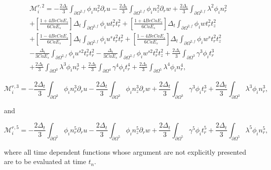 \documentclass{article}
\begin{document}
\begin{equation}
\begin{array}{l} \mathcal{M}_i^{r,2} = -\frac{2\Delta_t}{3} \int_{\partial \Omega^{2,f}} \phi_i n_r^2 \partial_r u - \frac{2\Delta_t}{3} \int_{\partial \Omega^{2,f}} \phi_i n_z^2 \partial_r w + \frac{2\Delta_t}{3} \int_{\partial \Omega^{2,f}} \lambda^2 \phi_i n_r^2 \\ + \left[ \frac{1 + 4Be Ca E_s}{6Ca E_s} \right] \Delta_t \int_{\partial \Omega^{2,f}} \phi_i u t_r^2 t_r^2 + \left[ \frac{1 + 4Be Ca E_s}{6Ca E_s} \right] \Delta_t \int_{\partial \Omega^{2,f}} \phi_i w t_r^2 t_z^2 \\ + \left[ \frac{1 - 4Be Ca E_s}{6Ca E_s} \right] \Delta_t \int_{\partial \Omega^{2,f}} \phi_i u^s t_r^2 t_r^2 + \left[ \frac{1 - 4Be Ca E_s}{6Ca E_s} \right] \Delta_t \int_{\partial \Omega^{2,f}} \phi_i w^s t_r^2 t_z^2 \\ - \frac{\Delta_t}{3Ca E_s} \int_{\partial \Omega^{2,f}} \phi_i u^{s2} t_r^2 t_r^2 - \frac{\Delta_t}{3Ca E_s} \int_{\partial \Omega^{2,f}} \phi_i w^{s2} t_r^2 t_z^2 + \frac{2\Delta_t}{3} \int_{\partial \Omega^{3}} \gamma^3 \phi_i t_r^3 \\ + \frac{2\Delta_t}{3} \int_{\partial \Omega^{3}} \lambda^3 \phi_i n_r^3 + \frac{2\Delta_t}{3} \int_{\partial \Omega^{4}} \gamma^4 \phi_i t_r^4 + \frac{2\Delta_t}{3} \int_{\partial \Omega^{5}} \lambda^4 \phi_i n_r^4, \end{array} \tag{4.63}
\end{equation}

\begin{equation}
\mathcal{M}_i^{r,3} = -\frac{2\Delta_t}{3} \int_{\partial \Omega^{3}} \phi_i n_r^3 \partial_r u - \frac{2\Delta_t}{3} \int_{\partial \Omega^{3}} \phi_i n_z^3 \partial_r w + \frac{2\Delta_t}{3} \int_{\partial \Omega^{3}} \gamma^3 \phi_i t_r^3 + \frac{2\Delta_t}{3} \int_{\partial \Omega^{3}} \lambda^3 \phi_i n_r^3, \tag{4.64}
\end{equation}

and

\begin{equation}
\mathcal{M}_i^{r,5} = -\frac{2\Delta_t}{3} \int_{\partial \Omega^{5}} \phi_i n_r^5 \partial_r u - \frac{2\Delta_t}{3} \int_{\partial \Omega^{5}} \phi_i n_z^5 \partial_r w + \frac{2\Delta_t}{3} \int_{\partial \Omega^{5}} \gamma^5 \phi_i t_r^5 + \frac{2\Delta_t}{3} \int_{\partial \Omega^{5}} \lambda^5 \phi_i n_r^5, \tag{4.65}
\end{equation}

where all time dependent functions whose argument are not explicitly presented are to be evaluated at time \(t_n\).
\end{document}
